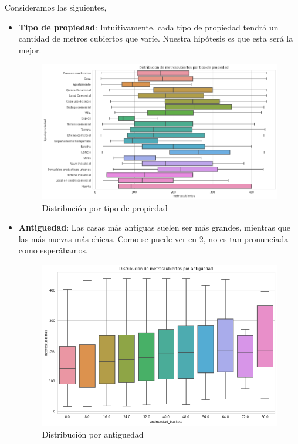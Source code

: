     Consideramos las siguientes,
    
    \begin{itemize}
        \item \textbf{Tipo de propiedad}: Intuitivamente, cada tipo de propiedad tendrá un cantidad de metros cubiertos que varíe. Nuestra hipótesis es que esta será la mejor.
        
        \begin{figure}[H]
            \centering
            \includegraphics[scale=0.45]{img/cmp/metroscubiertos/dist-tipodepropiedad.png}
            \caption{Distribución por tipo de propiedad}
            \label{fig:m2-dist-prop}
        \end{figure}
        
        \item \textbf{Antiguedad}: Las casas más antiguas suelen ser más grandes, mientras que las más nuevas más chicas. Como se puede ver en \ref{fig:m2-dist-ant}, no es tan pronunciada como esperábamos.
        
        \begin{figure}[H]
            \centering
            \includegraphics[scale=0.45]{img/cmp/metroscubiertos/dist-antiguedad.png}
            \caption{Distribución por antiguedad}
            \label{fig:m2-dist-ant}
        \end{figure}


\end{itemize}
